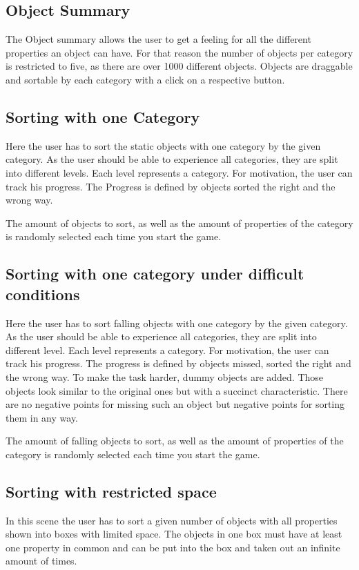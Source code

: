 \subsection{Object Summary}\label{subsec:object-summary}
The Object summary allows the user to get a feeling for all the different properties an object can have.
For that reason the number of objects per category is restricted to five, as there are over 1000 different objects.
Objects are draggable and sortable by each category with a click on a respective button.

\subsection{Sorting with one Category}\label{subsec:sorting-with-one-category}
Here the user has to sort the static objects with one category by the given category.
As the user should be able to experience all categories, they are split into different levels.
Each level represents a category.
For motivation, the user can track his progress.
The Progress is defined by objects sorted the right and the wrong way.

The amount of objects to sort, as well as the amount of properties of the category
is randomly selected each time you start the game.

\subsection{Sorting with one category under difficult conditions}\label{subsec:sorting-with-one-category-under-difficult-conditions}
Here the user has to sort falling objects with one category by the given category.
As the user should be able to experience all categories, they are split into different level.
Each level represents a category.
For motivation, the user can track his progress.
The progress is defined by objects missed, sorted the right and the wrong way.
To make the task harder, dummy objects are added.
Those objects look similar to the original ones but with a succinct characteristic.
There are no negative points for missing such an object but negative points for sorting them in any way.

The amount of falling objects to sort, as well as the amount of properties of the category
is randomly selected each time you start the game.

\subsection{Sorting with restricted space}\label{subsec:sorting-with-restricted-space}
In this scene the user has to sort a given number of objects with all properties shown into boxes with limited space.
The objects in one box must have at least one property in common and
can be put into the box and taken out an infinite amount of times.

